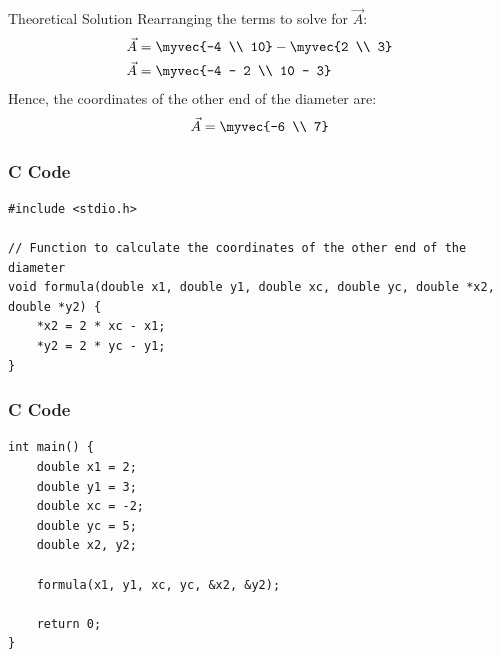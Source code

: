 \documentclass{beamer}
\begin{document}
\begin{frame}{Theoretical Solution}
Rearranging the terms to solve for $\vec{A}$:
\begin{align}
\vec{A} &= \myvec{-4 \\ 10} - \myvec{2 \\ 3} \\
\vec{A} &= \myvec{-4 - 2 \\ 10 - 3}
\end{align}
Hence, the coordinates of the other end of the diameter are:
\begin{align}
\vec{A} = \myvec{-6 \\ 7}
\end{align}

\end{frame}

\begin{frame}[fragile]
\frametitle{C Code }


\begin{lstlisting}
#include <stdio.h>

// Function to calculate the coordinates of the other end of the diameter
void formula(double x1, double y1, double xc, double yc, double *x2, double *y2) {
    *x2 = 2 * xc - x1;
    *y2 = 2 * yc - y1;
}
\end{lstlisting}
\end{frame}

\begin{frame}[fragile]
\frametitle{C Code }
\begin{lstlisting}
int main() {
    double x1 = 2;
    double y1 = 3;
    double xc = -2;
    double yc = 5;
    double x2, y2;

    formula(x1, y1, xc, yc, &x2, &y2);

    return 0;
}

\end{lstlisting}
\end{frame}
\end{document}
